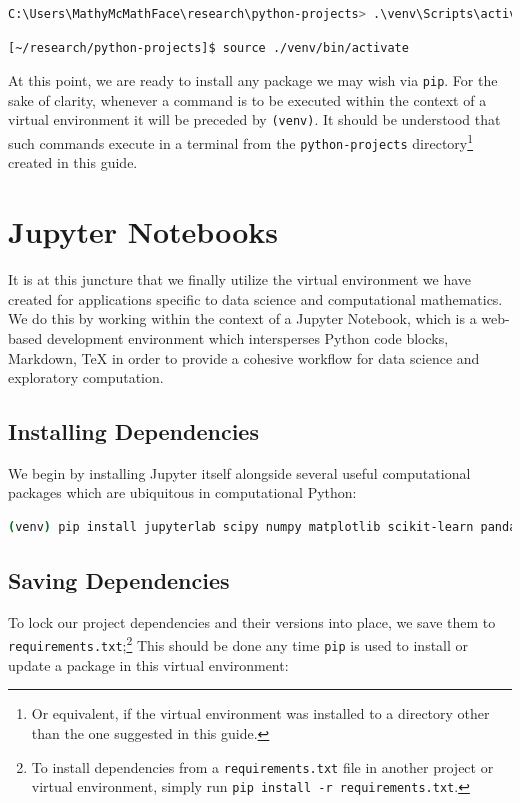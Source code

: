 \documentclass[12pt]{article}
\begin{document}
\begin{lstlisting}[language=bash, caption=Activate Virtual Environment (Windows)]
C:\Users\MathyMcMathFace\research\python-projects> .\venv\Scripts\activate
\end{lstlisting}

\begin{lstlisting}[language=bash, caption=Activate Virtual Environment (MacOS/Linux)]
[~/research/python-projects]$ source ./venv/bin/activate
\end{lstlisting}

At this point, we are ready to install any package we may wish via \texttt{pip}. For the sake of clarity, whenever a
command is to be executed within the context of a virtual environment it will be preceded by 
\texttt{(venv)}. It should be understood that such commands execute in a terminal from the 
\texttt{python-projects} directory\footnote{
    Or equivalent, if the virtual environment was installed to a directory other than the one suggested in this guide.
} created in this guide.

\section{Jupyter Notebooks}\label{sec:jupyter-notebooks}

It is at this juncture that we finally utilize the virtual environment we have created for applications specific to 
data science and computational mathematics. We do this by working within the context of a Jupyter Notebook, which
is a web-based development environment which intersperses Python code blocks, Markdown, TeX in order to provide a
cohesive workflow for data science and exploratory computation.

\subsection{Installing Dependencies}\label{sec:jupyter-notebooks-installing-dependencies}

We begin by installing Jupyter itself alongside several useful computational 
packages which are ubiquitous in computational Python:

\begin{lstlisting}[language=bash, caption=Computational Python Libraries (Windows)]
(venv) pip install jupyterlab scipy numpy matplotlib scikit-learn pandas ipywidgets
\end{lstlisting}


\subsection{Saving Dependencies}\label{sec:jupyter-notebooks-saving-dependencies}
To lock our project dependencies and their versions into place, we save them to \texttt{requirements.txt};\footnote{
    To install dependencies from a \texttt{requirements.txt} file in another project or virtual environment, simply run 
    \texttt{pip install -r requirements.txt}.
} This should be done any time \texttt{pip} is used to install or update a package in this virtual environment:
\end{document}
